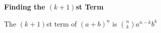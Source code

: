 {\bf Finding the $(k+1)$st Term}
\vskip 6pt

The $(k+1)$st term of ${(a+b)}^n$ is ${n\choose k}a^{n-k}b^k$

\vfill\eject
